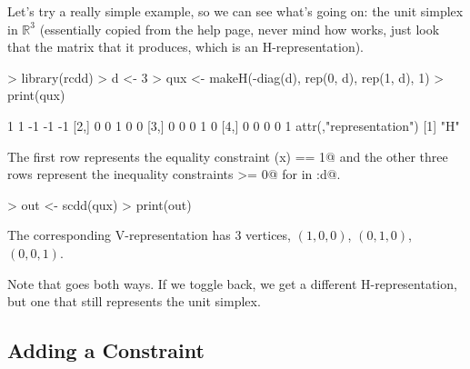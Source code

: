 \documentclass{article}
\newcommand{\real}{\mathbb{R}}
\begin{document}
Let's try a really simple example, so we can see what's going on:
the unit simplex in $\real^3$ (essentially copied from the \verb@scdd@
help page, never mind how \verb@makeH@ works, just look that the matrix
\verb@qux@ that it produces, which is an H-representation).
\begin{Schunk}
\begin{Sinput}
> library(rcdd)
> d <- 3
> qux <- makeH(-diag(d), rep(0, d), rep(1, d), 1)
> print(qux)
\end{Sinput}
\begin{Soutput}
     [,1] [,2] [,3] [,4] [,5]
[1,]    1    1   -1   -1   -1
[2,]    0    0    1    0    0
[3,]    0    0    0    1    0
[4,]    0    0    0    0    1
attr(,"representation")
[1] "H"
\end{Soutput}
\end{Schunk}
The first row represents the equality constraint \verb@sum(x) == 1@
and the other three rows represent the inequality constraints \verb@x[i] >= 0@
for \verb@i@ in :d@.
\begin{Schunk}
\begin{Sinput}
> out <- scdd(qux)
> print(out)
\end{Sinput}
\end{Schunk}
The corresponding V-representation has 3 vertices,
$(1, 0, 0)$, $(0, 1, 0)$, $(0, 0, 1)$.
\begin{Schunk}
\end{Schunk}
Note that \verb@scdd@ goes both ways.  If we toggle back,
we get a different H-representation, but one that still
represents the unit simplex.

\subsection{Adding a Constraint}
\end{document}
